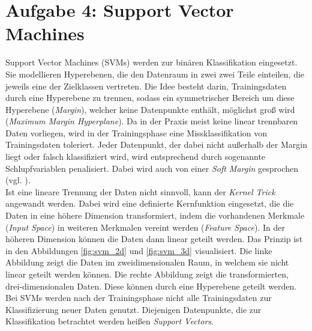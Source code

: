 \pagebreak
\section{Aufgabe 4: Support Vector Machines}
Support Vector Machines (SVMs) werden zur binären Klassifikation eingesetzt. Sie modellieren Hyperebenen, die den Datenraum in zwei zwei Teile einteilen, die jeweils eine der Zielklassen vertreten. Die Idee besteht darin, Trainingsdaten durch eine Hyperebene zu trennen, sodass ein symmetrischer Bereich um diese Hyperebene (\emph{Margin}), welcher keine Datenpunkte enthält, möglichst groß wird (\emph{Maximum Margin Hyperplane}). Da in der Praxis meist keine linear trennbaren Daten vorliegen, wird in der Trainingsphase eine Missklassifikation von Trainingsdaten toleriert. Jeder Datenpunkt, der dabei nicht außerhalb der Margin liegt oder falsch klassifiziert wird, wird entsprechend durch sogenannte Schlupfvariablen penalisiert. Dabei wird auch von einer \emph{Soft Margin} gesprochen (vgl. \cite{2015_aggarwal}).\\
\noindent \hspace*{7mm}
Ist eine lineare Trennung der Daten nicht sinnvoll, kann der \emph{Kernel Trick} angewandt werden. Dabei wird eine definierte Kernfunktion eingesetzt, die die Daten in eine höhere Dimension transformiert, indem die vorhandenen Merkmale (\emph{Input Space}) in weiteren Merkmalen vereint werden (\emph{Feature Space}). In der höheren Dimension können die Daten dann linear geteilt werden. Das Prinzip ist in den Abbildungen \ref{fig:svm_2d} und \ref{fig:svm_3d} visualisiert. Die linke Abbildung zeigt die Daten im zweidimensionalen Raum, in welchem sie nicht linear geteilt werden können. Die rechte Abbildung zeigt die transformierten, drei-dimensionalen Daten. Diese können durch eine Hyperebene geteilt werden.\\
\noindent \hspace*{7mm}
Bei SVMs werden nach der Trainingsphase nicht alle Trainingsdaten zur Klassifizierung neuer Daten genutzt. Diejenigen Datenpunkte, die zur Klassifikation betrachtet werden heißen \emph{Support Vectors}.
